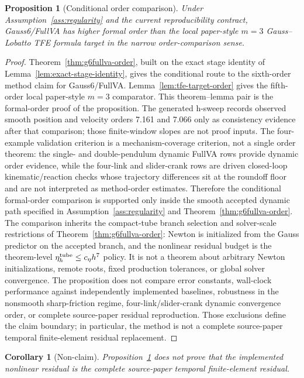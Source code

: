 \documentclass[preprint,12pt]{elsarticle}
\newtheorem{proposition}{Proposition}
\newtheorem{corollary}{Corollary}
\newcommand{\method}{Gauss6\slash FullVA}
\newcommand{\tfe}{TFE}
\begin{document}
\begin{proposition}[Conditional order comparison]
\label{prop:order-comparison}
Under Assumption~\ref{ass:regularity} and the current reproducibility
contract,
\method{} has higher formal order than the local paper-style
$m=3$ Gauss--Lobatto \tfe{} formula target in the narrow order-comparison
sense.
\end{proposition}

\begin{proof}
Theorem~\ref{thm:g6fullva-order}, built on the exact stage identity of
Lemma~\ref{lem:exact-stage-identity}, gives the conditional route to the
sixth-order method claim for \method{}. Lemma~\ref{lem:tfe-target-order}
gives the fifth-order local
paper-style $m=3$ comparator. This theorem--lemma pair is the formal-order
proof of the proposition. The generated h-sweep records observed smooth
position and velocity orders 7.161 and 7.066 only as consistency evidence
after that comparison; those finite-window slopes are not proof inputs. The
four-example validation criterion is a mechanism-coverage criterion, not a single order
theorem: the single- and
double-pendulum dynamic FullVA rows provide dynamic order evidence, while the
four-link and slider-crank rows are driven closed-loop kinematic/reaction
checks whose trajectory differences sit at the roundoff floor and are not
interpreted as method-order estimates. Therefore the conditional formal-order
comparison is supported only inside the smooth accepted dynamic path specified
in Assumption~\ref{ass:regularity} and Theorem~\ref{thm:g6fullva-order}. The
comparison inherits the compact-tube branch selection and solver-scale
restrictions of Theorem~\ref{thm:g6fullva-order}: Newton is initialized from
the Gauss predictor on the accepted branch, and the nonlinear residual budget
is the theorem-level \(\eta_h^{\rm tube}\le c_\eta h^7\) policy. It is not a
theorem about arbitrary Newton initializations, remote roots, fixed production
tolerances, or global solver convergence. The proposition does not compare
error constants, wall-clock performance against independently implemented
baselines, robustness in the nonsmooth sharp-friction regime,
four-link/slider-crank dynamic convergence order, or complete source-paper
residual reproduction. Those exclusions define the claim boundary; in
particular, the method is not a complete source-paper temporal finite-element
residual replacement.
\end{proof}

\begin{corollary}[Non-claim]
Proposition~\ref{prop:order-comparison} does not prove that the implemented
nonlinear residual is the complete source-paper temporal finite-element
residual.
\end{corollary}
\end{document}
